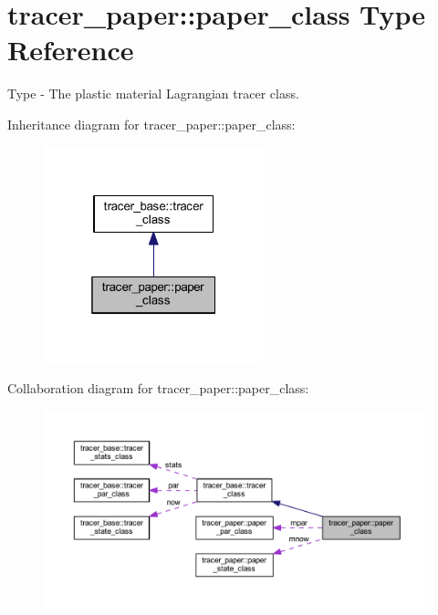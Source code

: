 \hypertarget{structtracer__paper_1_1paper__class}{}\section{tracer\+\_\+paper\+:\+:paper\+\_\+class Type Reference}
\label{structtracer__paper_1_1paper__class}


Type -\/ The plastic material Lagrangian tracer class.  




Inheritance diagram for tracer\+\_\+paper\+:\+:paper\+\_\+class\+:\nopagebreak
\begin{figure}[H]
\begin{center}
\leavevmode
\includegraphics[width=181pt]{structtracer__paper_1_1paper__class__inherit__graph}
\end{center}
\end{figure}


Collaboration diagram for tracer\+\_\+paper\+:\+:paper\+\_\+class\+:\nopagebreak
\begin{figure}[H]
\begin{center}
\leavevmode
\includegraphics[width=350pt]{structtracer__paper_1_1paper__class__coll__graph}
\end{center}
\end{figure}

